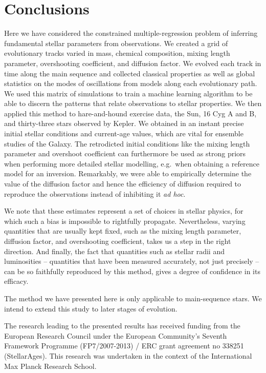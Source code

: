 \documentclass[manuscript]{aastex}
\begin{document}
\section{Conclusions}
Here we have considered the constrained multiple-regression problem of inferring fundamental stellar parameters from observations. We created a grid of evolutionary tracks varied in mass, chemical composition, mixing length parameter, overshooting coefficient, and diffusion factor. We evolved each track in time along the main sequence and collected classical properties as well as global statistics on the modes of oscillations from models along each evolutionary path. We used this matrix of simulations to train a machine learning algorithm to be able to discern the patterns that relate observations to stellar properties. We then applied this method to hare-and-hound exercise data, the Sun, 16 Cyg A and B, and thirty-three stars observed by Kepler. We obtained in an instant precise initial stellar conditions and current-age values, which are vital for ensemble studies of the Galaxy. The retrodicted initial conditions like the mixing length parameter and overshoot coefficient can furthermore be used as strong priors when performing more detailed stellar modelling, e.g.~when obtaining a reference model for an inversion. Remarkably, we were able to empirically determine the value of the diffusion factor and hence the efficiency of diffusion required to reproduce the observations instead of inhibiting it \emph{ad hoc}. 

We note that these estimates represent a set of choices in stellar physics, for which such a bias is impossible to rightfully propagate. Nevertheless, varying quantities that are usually kept fixed, such as the mixing length parameter, diffusion factor, and overshooting coefficient, takes us a step in the right direction. And finally, the fact that quantities such as stellar radii and luminosities -- quantities that have been measured accurately, not just precisely -- can be so faithfully reproduced by this method, gives a degree of confidence in its efficacy. 

The method we have presented here is only applicable to main-sequence stars. We intend to extend this study to later stages of evolution. 


\acknowledgments The research leading to the presented results has received funding from the European Research Council under the European Community's Seventh Framework Programme (FP7/2007-2013) / ERC grant agreement no 338251 (StellarAges). This research was undertaken in the context of the International Max Planck Research School. 
\end{document}
